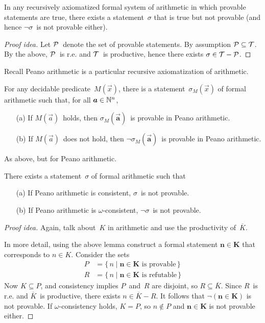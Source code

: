 \begin{thm}
In any recursively axiomatized formal system of arithmetic in which provable statements are true, there exists a statement~\(\sigma\) that is true but not provable (and hence \(\lnot\sigma\)~is not provable either).
\end{thm}
\begin{proof}[Proof idea]
Let \(\P\)~denote the set of provable statements. By assumption \(\P\subseteq\T\). By the above, \(\P\)~is r.e. and \(\T\)~is productive, hence there exists \(\sigma\in\T-\P\).
\end{proof}

\noindent Recall Peano arithmetic is a particular recursive axiomatization of arithmetic.

\begin{lem}[Representations]
For any decidable predicate~\(M(\vec{x})\), there is a statement~\(\sigma_M(\vec{x})\) of formal arithmetic such that, for all \(\vec{a}\in\N^n\),
\begin{enumerate}[itemsep=0pt]
\item[(a)] If \(M(\vec{a})\)~holds, then \(\sigma_M(\vec{\mathbf{a}})\)~is provable in Peano arithmetic.
\item[(b)] If \(M(\vec{a})\)~does not hold, then \(\lnot\sigma_M(\vec{\mathbf{a}})\)~is provable in Peano arithmetic.
\end{enumerate}
\end{lem}
\begin{app}
As above, but for Peano arithmetic.
\end{app}

\begin{thm}
There exists a statement~\(\sigma\) of formal arithmetic such that
\begin{enumerate}[itemsep=0pt]
\item[(a)] If Peano arithmetic is consistent, \(\sigma\)~is not provable.
\item[(b)] If Peano arithmetic is \(\omega\)-consistent, \(\lnot\sigma\)~is not provable.
\end{enumerate}
\end{thm}
\begin{proof}[Proof idea]
Again, talk about~\(K\) in arithmetic and use the productivity of~\(\overline{K}\).

In more detail, using the above lemma construct a formal statement \(\mathbf{n\in K}\) that corresponds to \(n\in K\). Consider the sets
\begin{align*}
P&=\{\,n\mid\mathbf{n\in K}\text{ is provable}\,\}\\
R&=\{\,n\mid\mathbf{n\in K}\text{ is refutable}\,\}
\end{align*}
Now \(K\subseteq P\), and consistency implies \(P\)~and~\(R\) are disjoint, so \(R\subseteq\overline{K}\). Since \(R\)~is r.e. and \(\overline{K}\)~is productive, there exists \(n\in\overline{K}-R\). It follows that \(\lnot(\mathbf{n\in K})\) is not provable. If \(\omega\)-consistency holds, \(K=P\), so \(n\not\in P\) and \(\mathbf{n\in K}\) is not provable either.
\end{proof}

